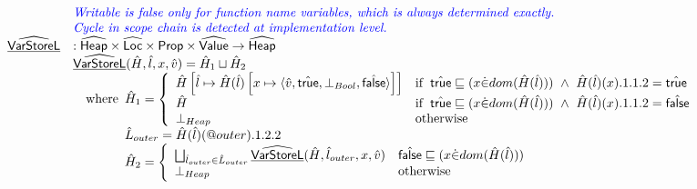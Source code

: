 \[\begin{array}{ll}
& {\color{blue} \textit{Writable is false only for function name variables, which is always determined exactly.}} \\
& {\color{blue} \textit{Cycle in scope chain is detected at implementation level.}} \\
\widehat{\underline{\sf VarStoreL}} & : \widehat{\mbox{\textsf{Heap}}} \times \widehat{\mbox{\textsf{Loc}}} \times \mbox{\textsf{Prop}} \times \widehat{\mbox{\textsf{Value}}} \rightarrow \widehat{\mbox{\textsf{Heap}}}\\
& \widehat{\underline{\sf VarStoreL}}(\hat{H}, \hat{l}, x, \hat{v}) = \hat{H}_1 \sqcup \hat{H}_2 \\
& \quad{\rm where}\begin{array}[t]{l}
    \hat{H}_1 = 
      \left\{
      \begin{array}{ll}
        \hat{H}\left[\hat{l}\mapsto \hat{H}(\hat{l})\left[x \mapsto \langle\hat{v},\hat{\mbox{\textsf{true}}},\bot_{Bool},\hat{\mbox{\textsf{false}}}\rangle\right]\right] 
          & {\rm if}\begin{array}[t]{l}\hat{\mbox{\textsf{true}}} \sqsubseteq (x \dot{\in} dom(\hat{H}(\hat{l}))) ~\land~ \hat{H}(\hat{l})(x).1.1.2 = \hat{\mbox{\textsf{true}}}\end{array} \\
        \hat{H} 
          & {\rm if}\begin{array}[t]{l}\hat{\mbox{\textsf{true}}} \sqsubseteq (x \dot{\in} dom(\hat{H}(\hat{l}))) ~\land~ \hat{H}(\hat{l})(x).1.1.2 = \hat{\mbox{\textsf{false}}}\end{array} \\
        \bot_{Heap} & {\rm otherwise} \\
      \end{array}
      \right. \\
    \hat{L}_{outer} = \hat{H}(\hat{l})(@outer).1.2.2 \\
    \hat{H}_2 = 
      \left\{ 
      \begin{array}{ll}
        \bigsqcup_{\hat{l}_{outer}\in\hat{L}_{outer}}\widehat{\underline{\sf VarStoreL}}(\hat{H}, \hat{l}_{outer}, x, \hat{v})
          & \hat{\mbox{\textsf{false}}} \sqsubseteq (x \dot{\in} dom(\hat{H}(\hat{l}))) \\
        \bot_{Heap} & {\rm otherwise} \\
      \end{array}
      \right. \\
  \end{array} \\
\\


\end{array}\]
